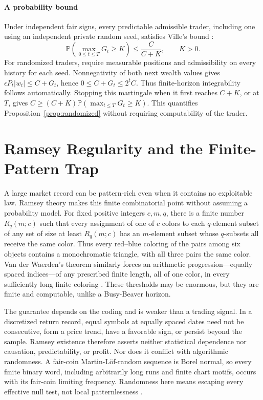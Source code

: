 \documentclass[aps,pra,reprint,superscriptaddress,amsmath,amssymb,floatfix]{revtex4-2}
\theoremstyle{plain}
\theoremstyle{definition}
\theoremstyle{remark}
\begin{document}
\paragraph{A probability bound}
Under independent fair signs, every predictable admissible trader, including
one using an independent private random seed, satisfies Ville's bound
\cite{Ville1939}:
\[
  \mathbb P\!\left(\max_{0\le t\le T}G_t\ge K\right)
  \le\frac{C}{C+K},\qquad K>0.
\]
For randomized traders, require measurable positions and admissibility on
every history for each seed. Nonnegativity of both next wealth values gives
\(\epsilon P_t|w_t|\le C+G_t\), hence \(0\le C+G_t\le2^tC\).
Thus finite-horizon integrability follows automatically.
Stopping this martingale when it first reaches \(C+K\), or at \(T\),
gives \(C\ge(C+K)\mathbb P(\max_{t\le T}G_t\ge K)\).
This quantifies Proposition~\ref{prop:randomized} without requiring
computability of the trader.

\section{Ramsey Regularity and the Finite-Pattern Trap}
\label{sec:ramseytrap}

A large market record can be pattern-rich even when it contains no exploitable
law. Ramsey theory makes this finite combinatorial point without assuming a
probability model. For fixed positive integers \(c,m,q\), there is a finite
number \(R_q(m;c)\) such that every assignment of one of \(c\) colors to
each \(q\)-element subset of any set of size at least \(R_q(m;c)\) has an
\(m\)-element subset whose \(q\)-subsets all receive the same color. Thus every red--blue coloring of the
pairs among six objects contains a monochromatic triangle, with all three
pairs the same color. Van der Waerden's theorem similarly forces an arithmetic
progression---equally spaced indices---of any prescribed finite length, all
of one color, in every sufficiently long finite coloring
\cite{Ramsey-GRS-90,GS-90}. These thresholds may be enormous, but they are
finite and computable, unlike a Busy-Beaver horizon.

The guarantee depends on the coding and is weaker than a trading signal. In a
discretized return record, equal symbols at equally spaced dates need not be
consecutive, form a price trend, have a favorable sign, or persist beyond the
sample. Ramsey existence therefore asserts neither statistical dependence nor
causation, predictability, or profit. Nor does it conflict with algorithmic
randomness. A fair-coin Martin-L\"of-random sequence is Borel normal, so every
finite binary word, including arbitrarily long runs and finite chart motifs,
occurs with its fair-coin limiting frequency. Randomness here means escaping
every effective null test, not local patternlessness
\cite{calude:02,Nies2009}.
\end{document}
